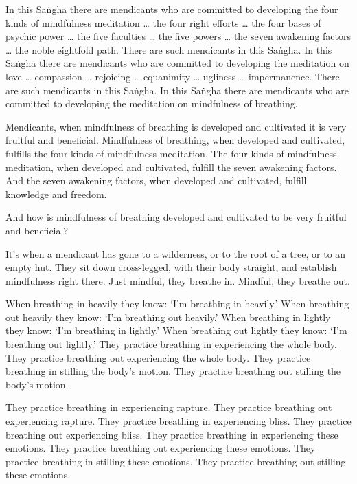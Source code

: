 \documentclass[12pt,openany]{book}%
\begin{document}
In this \textsanskrit{Saṅgha} there are mendicants who are committed to developing the four kinds of mindfulness meditation … the four right efforts … the four bases of psychic power … the five faculties … the five powers … the seven awakening factors … the noble eightfold path. There are such mendicants in this \textsanskrit{Saṅgha}. In this \textsanskrit{Saṅgha} there are mendicants who are committed to developing the meditation on love … compassion … rejoicing … equanimity … ugliness … impermanence. There are such mendicants in this \textsanskrit{Saṅgha}. In this \textsanskrit{Saṅgha} there are mendicants who are committed to developing the meditation on mindfulness of breathing. 

Mendicants, when mindfulness of breathing is developed and cultivated it is very fruitful and beneficial. Mindfulness of breathing, when developed and cultivated, fulfills the four kinds of mindfulness meditation. The four kinds of mindfulness meditation, when developed and cultivated, fulfill the seven awakening factors. And the seven awakening factors, when developed and cultivated, fulfill knowledge and freedom. 

And how is mindfulness of breathing developed and cultivated to be very fruitful and beneficial? 

It’s when a mendicant has gone to a wilderness, or to the root of a tree, or to an empty hut. They sit down cross-legged, with their body straight, and establish mindfulness right there. Just mindful, they breathe in. Mindful, they breathe out. 

When breathing in heavily they know: ‘I’m breathing in heavily.’ When breathing out heavily they know: ‘I’m breathing out heavily.’ When breathing in lightly they know: ‘I’m breathing in lightly.’ When breathing out lightly they know: ‘I’m breathing out lightly.’ They practice breathing in experiencing the whole body. They practice breathing out experiencing the whole body. They practice breathing in stilling the body’s motion. They practice breathing out stilling the body’s motion. 

They practice breathing in experiencing rapture. They practice breathing out experiencing rapture. They practice breathing in experiencing bliss. They practice breathing out experiencing bliss. They practice breathing in experiencing these emotions. They practice breathing out experiencing these emotions. They practice breathing in stilling these emotions. They practice breathing out stilling these emotions. 
\end{document}
